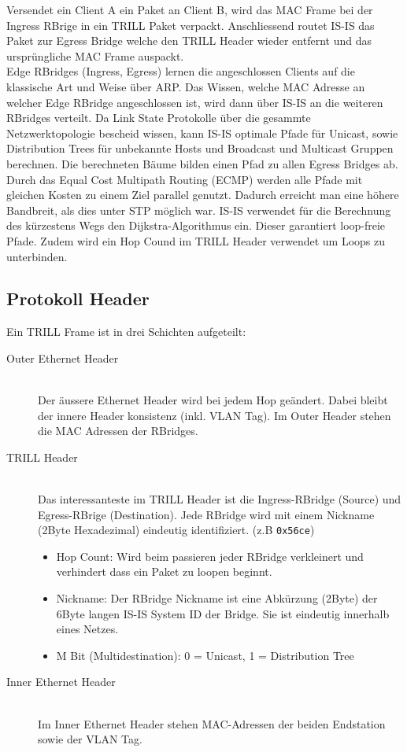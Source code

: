 Versendet ein Client A ein Paket an Client B, wird das MAC Frame bei der Ingress RBrige in ein TRILL Paket verpackt. Anschliessend routet IS-IS das Paket zur Egress Bridge welche den TRILL Header wieder entfernt und das ursprüngliche MAC Frame auspackt.  \\

Edge RBridges (Ingress, Egress) lernen die angeschlossen Clients auf die klassische Art und Weise über ARP. Das Wissen, welche MAC Adresse an welcher Edge RBridge angeschlossen ist, wird dann über IS-IS an die weiteren RBridges verteilt. Da Link State Protokolle über die gesammte Netzwerktopologie bescheid wissen, kann IS-IS optimale Pfade für Unicast, sowie Distribution Trees für unbekannte Hosts und Broadcast und Multicast Gruppen berechnen. Die berechneten Bäume bilden einen Pfad zu allen Egress Bridges ab. Durch das Equal Cost Multipath Routing (ECMP) werden alle Pfade mit gleichen Kosten zu einem Ziel parallel genutzt. Dadurch erreicht man eine höhere Bandbreit, als dies unter STP möglich war. IS-IS verwendet für die Berechnung des kürzestens Wegs den Dijkstra-Algorithmus ein. Dieser garantiert loop-freie Pfade. Zudem wird ein Hop Cound im TRILL Header verwendet um Loops zu unterbinden.

\subsection{Protokoll Header}
Ein TRILL Frame ist in drei Schichten aufgeteilt:
\begin{description}
	\item[Outer Ethernet Header] \hfill \\
	Der äussere Ethernet Header wird bei jedem Hop geändert. Dabei bleibt der innere Header konsistenz (inkl. VLAN Tag). Im Outer Header stehen die MAC Adressen der RBridges.
	\item[TRILL Header] \hfill \\
	Das interessanteste im TRILL Header ist die Ingress-RBridge (Source) und Egress-RBrige (Destination). Jede RBridge wird mit einem Nickname (2Byte Hexadezimal) eindeutig identifiziert. (z.B \lstinline[]|0x56ce|) 
	\begin{itemize}
		\item Hop Count: Wird beim passieren jeder RBridge verkleinert und verhindert dass ein Paket zu loopen beginnt. 
		\item Nickname: Der RBridge Nickname ist eine Abkürzung (2Byte) der 6Byte langen IS-IS System ID der Bridge. Sie ist eindeutig innerhalb eines Netzes. 
		\item M Bit (Multidestination): 0 = Unicast, 1 = Distribution Tree
	\end{itemize}
	\item[Inner Ethernet Header] \hfill \\
	Im Inner Ethernet Header stehen MAC-Adressen der beiden Endstation sowie der VLAN Tag.
\end{description}

